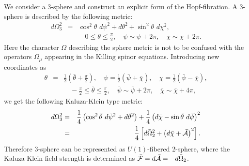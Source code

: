\documentclass[a4paper,12pt]{article}
\begin{document}
\begin{appendix}
We consider a 3-sphere and construct an explicit form of the Hopf-fibration. A 3-sphere is described by the following metric:
\begin{eqnarray}
d\Omega_3^2&=&\cos^2{\theta}\,\,d\psi^2+d\theta^2+\sin^2{\theta}\,\,d\chi^2,\nonumber\\
&&\quad 0\le\theta\le\frac{\pi}{2},\quad \psi\sim\psi+2\pi,\quad \chi\sim\chi+2\pi.
\end{eqnarray}
Here the character $\Omega$ describing the sphere metric is not to be confused with the operators $\Omega_\mu$ appearing in the Killing spinor equations.
Introducing new coordinates as
\begin{eqnarray}\label{new}
\theta&=&\frac{1}{2}\left(\bar{\theta}+\frac{\pi}{2}\right),\quad \psi=\frac{1}{2}\left(\bar{\psi}+\bar{\chi}\right),\quad \chi=\frac{1}{2}\left(\bar{\psi}-\bar{\chi}\right),\nonumber\\
&&\quad -\frac{\pi}{2}\le \bar{\theta}\le \frac{\pi}{2},\quad \bar{\psi}\sim\bar{\psi}+2\pi,\quad \bar{\chi}\sim \bar{\chi}+4\pi,
\end{eqnarray}
we get the following Kaluza-Klein type metric:
\begin{eqnarray}\label{fiber}
d\Omega_3^2&=&\frac{1}{4}\left(\cos^2{\bar{\theta}}\,\,d\bar{\psi}^2+d\bar{\theta}^2\right)+\frac{1}{4}\left(d\bar{\chi}-\sin{\bar{\theta}}\,\,d\bar{\psi}\right)^2\nonumber\\
&=&\frac{1}{4}\left[d\bar{\Omega}_2^2+\left(d\bar{\chi}+\bar{\cal A}\right)^2\right].
\end{eqnarray}
Therefore 3-sphere can be represented as $U(1)$-fibered 2-sphere, where the Kaluza-Klein field strength is determined as $\bar{\cal F}=d\bar{\cal A}=-d\bar{\Omega}_2$.
\end{appendix}
\end{document}
